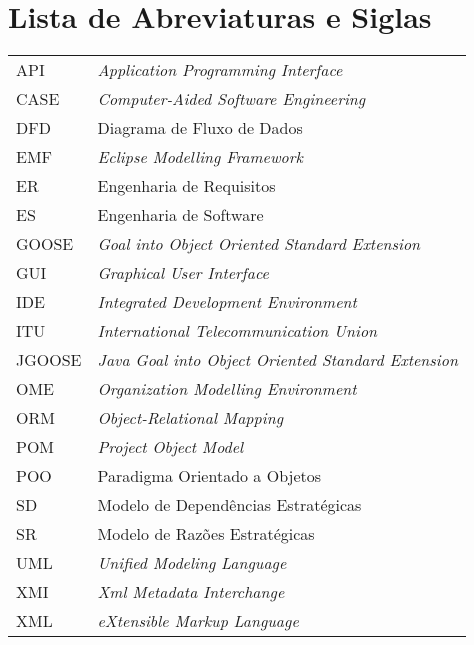 
\pagebreak
{}
\listoffigures


\pagebreak
{}
\chapter*{Lista de Abreviaturas e Siglas}
\begin{tabular}{ll}
	API			& \textit{Application Programming Interface}\\
	CASE		& \textit{Computer-Aided Software Engineering}\\
	DFD			& Diagrama de Fluxo de Dados\\
    EMF         & \textit{Eclipse Modelling Framework}\\
    ER          & Engenharia de Requisitos\\
    ES          & Engenharia de Software\\
    GOOSE       & \textit{Goal into Object Oriented Standard Extension}\\
    GUI         & \textit{Graphical User Interface}\\
	IDE			& \textit{Integrated Development Environment}\\
	ITU			& \textit{International Telecommunication Union}\\
	JGOOSE		& \textit{Java Goal into Object Oriented Standard Extension}\\
    OME         & \textit{Organization Modelling Environment}\\
    ORM         & \textit{Object-Relational Mapping}\\
    POM         & \textit{Project Object Model}\\
	POO			& Paradigma Orientado a Objetos\\
    SD          & Modelo de Dependências Estratégicas\\
    SR          & Modelo de Razões Estratégicas\\
	UML			& \textit{Unified Modeling Language}\\
	XMI			& \textit{Xml Metadata Interchange}\\
	XML			& \textit{eXtensible Markup Language}\\
\end{tabular}

